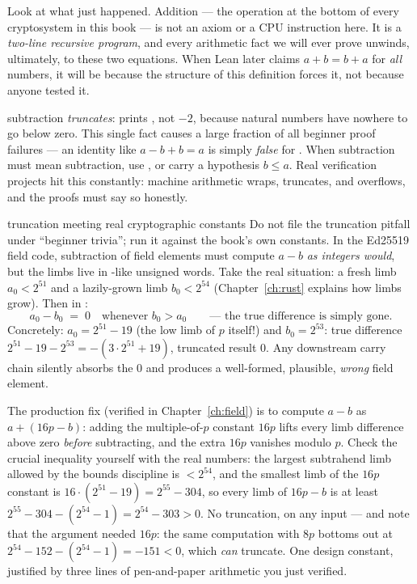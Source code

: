 \begin{aha}
Look at what just happened. Addition --- the operation at the bottom of every
cryptosystem in this book --- is not an axiom or a CPU instruction here. It is
a \emph{two-line recursive program}, and every arithmetic fact we will ever
prove unwinds, ultimately, to these two equations. When Lean later claims
$a + b = b + a$ for \emph{all} numbers, it will be because the structure of
this definition forces it, not because anyone tested it.
\end{aha}

\begin{pitfall}
 subtraction \emph{truncates}:  prints
, not $-2$, because natural numbers have nowhere to go below zero.
This single fact causes a large fraction of all beginner proof failures ---
an identity like $a - b + b = a$ is simply \emph{false} for . When
subtraction must mean subtraction, use , or carry a hypothesis
$b \le a$. Real verification projects hit this constantly: machine arithmetic
wraps, truncates, and overflows, and the proofs must say so honestly.
\end{pitfall}

\begin{worked}{truncation meeting real cryptographic constants}
Do not file the truncation pitfall under ``beginner trivia''; run it against
the book's own constants. In the Ed25519 field code, subtraction of field
elements must compute $a - b$ \emph{as integers would}, but the limbs live
in -like unsigned words. Take the real situation: a fresh limb
$a_0 < 2^{51}$ and a lazily-grown limb $b_0 < 2^{54}$
(Chapter~\ref{ch:rust} explains how limbs grow). Then in :
\[
a_0 - b_0 \;=\; 0 \quad\text{whenever } b_0 > a_0
\qquad\text{--- the true difference is simply gone.}
\]
Concretely: $a_0 = 2^{51} - 19$ (the low limb of $p$ itself!) and
$b_0 = 2^{53}$: true difference $2^{51} - 19 - 2^{53} = -(3\cdot 2^{51} + 19)$,
truncated result $0$. Any downstream carry chain silently absorbs the $0$
and produces a well-formed, plausible, \emph{wrong} field element.

The production fix (verified in Chapter~\ref{ch:field}) is to compute
$a - b$ as $a + (16p - b)$: adding the multiple-of-$p$ constant $16p$ lifts
every limb difference above zero \emph{before} subtracting, and the extra
$16p$ vanishes modulo $p$. Check the crucial inequality yourself with the
real numbers: the largest subtrahend limb allowed by the bounds discipline
is $< 2^{54}$, and the smallest limb of the $16p$ constant is
$16 \cdot (2^{51} - 19) = 2^{55} - 304$, so every limb of $16p - b$ is at
least $2^{55} - 304 - (2^{54} - 1) = 2^{54} - 303 > 0$. No truncation, on
any input --- and note that the argument needed $16p$: the same computation
with $8p$ bottoms out at $2^{54} - 152 - (2^{54} - 1) = -151 < 0$, which
\emph{can} truncate. One design constant, justified by three lines of
pen-and-paper arithmetic you just verified.
\end{worked}

